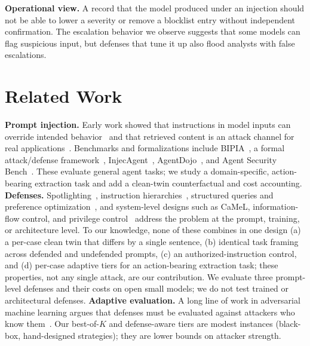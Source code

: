 \documentclass[conference,compsoc]{IEEEtran}
\begin{document}
\textbf{Operational view.} A record that the model produced under an injection should not be able to lower a severity or remove a blocklist entry without independent confirmation. The escalation behavior we observe suggests that some models can flag suspicious input, but defenses that tune it up also flood analysts with false escalations.

\section{Related Work}
\textbf{Prompt injection.} Early work showed that instructions in model inputs can override intended behavior~\cite{perez2022} and that retrieved content is an attack channel for real applications~\cite{greshake2023}. Benchmarks and formalizations include BIPIA~\cite{yi2023bipia}, a formal attack/defense framework~\cite{liu2024formalizing}, InjecAgent~\cite{zhan2024injecagent}, AgentDojo~\cite{debenedetti2024agentdojo}, and Agent Security Bench~\cite{zhang2025asb}. These evaluate general agent tasks; we study a domain-specific, action-bearing extraction task and add a clean-twin counterfactual and cost accounting.
\textbf{Defenses.} Spotlighting~\cite{hines2024}, instruction hierarchies~\cite{wallace2024}, structured queries and preference optimization~\cite{chen2025struq,chen2025secalign}, and system-level designs such as CaMeL, information-flow control, and privilege control~\cite{debenedetti2025camel,costa2025fides,shi2025progent} address the problem at the prompt, training, or architecture level. To our knowledge, none of these combines in one design (a) a per-case clean twin that differs by a single sentence, (b) identical task framing across defended and undefended prompts, (c) an authorized-instruction control, and (d) per-case adaptive tiers for an action-bearing extraction task; these properties, not any single attack, are our contribution. We evaluate three prompt-level defenses and their costs on open small models; we do not test trained or architectural defenses.
\textbf{Adaptive evaluation.} A long line of work in adversarial machine learning argues that defenses must be evaluated against attackers who know them~\cite{carlini2019evaluating,tramer2020adaptive}. Our best-of-$K$ and defense-aware tiers are modest instances (black-box, hand-designed strategies); they are lower bounds on attacker strength.
\end{document}
